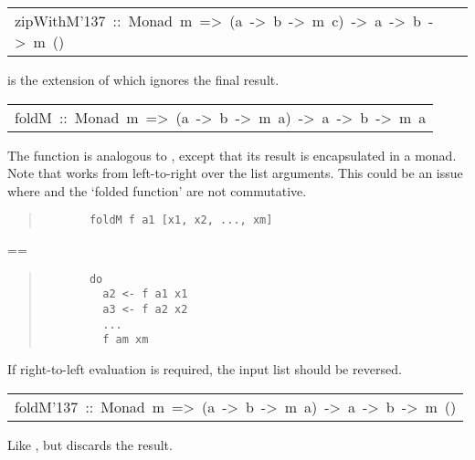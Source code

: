 \begin{haddockdesc}
\item[\begin{tabular}{@{}l}
zipWithM{\char '137}\ ::\ Monad\ m\ =>\ (a\ ->\ b\ ->\ m\ c)\ ->\ {\char 91}a{\char 93}\ ->\ {\char 91}b{\char 93}\ ->\ m\ ()
\end{tabular}]\haddockbegindoc
{} is the extension of  which ignores the final result.
\par

\end{haddockdesc}
\begin{haddockdesc}
\item[\begin{tabular}{@{}l}
foldM\ ::\ Monad\ m\ =>\ (a\ ->\ b\ ->\ m\ a)\ ->\ a\ ->\ {\char 91}b{\char 93}\ ->\ m\ a
\end{tabular}]\haddockbegindoc
The  function is analogous to , except that its result is
encapsulated in a monad. Note that  works from left-to-right over
the list arguments. This could be an issue where \haddocktt{(>>)} and the `folded
function' are not commutative.
\par
\begin{quote}
{\haddockverb\begin{verbatim}
       foldM f a1 [x1, x2, ..., xm]
\end{verbatim}}
\end{quote}
==  
\par
\begin{quote}
{\haddockverb\begin{verbatim}
       do
         a2 <- f a1 x1
         a3 <- f a2 x2
         ...
         f am xm
\end{verbatim}}
\end{quote}
If right-to-left evaluation is required, the input list should be reversed.
\par

\end{haddockdesc}
\begin{haddockdesc}
\item[\begin{tabular}{@{}l}
foldM{\char '137}\ ::\ Monad\ m\ =>\ (a\ ->\ b\ ->\ m\ a)\ ->\ a\ ->\ {\char 91}b{\char 93}\ ->\ m\ ()
\end{tabular}]\haddockbegindoc
Like , but discards the result.
\par

\end{haddockdesc}
